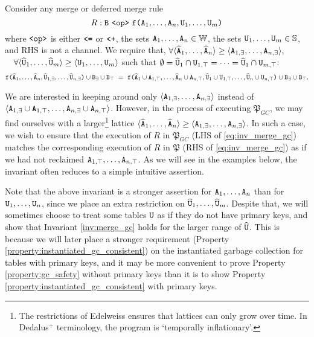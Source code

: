 \begin{invariant}\label{inv:merge_gc}
Consider any merge or deferred merge rule 
\[R: \tt{B} ~\tt{<op>}~ \tt{f(}\tt{A}_1,\dots,\tt{A}_n, \tt{U}_1, \dots, \tt{U}_m\tt{)}\]
where $\tt{<op>}$ is either $\tt{<=}$ or $\tt{<+}$,
the sets $\tt{A}_1,\dots,\tt{A}_n \in \mathbb{W}$,
the sets $\tt{U}_1,\dots,\tt{U}_m \in \mathbb{S}$,
and RHS is not a channel.
We require that, 
$\forall \langle \widehat{\tt{A}}_1, \dots, \widehat{\tt{A}}_n\rangle \geq \langle \tt{A}_{1,\exists},\dots,\tt{A}_{n,\exists} \rangle,$
$\quad
\forall \langle \widehat{\tt{U}}_1 , \dots, \widehat{\tt{U}}_m \rangle \geq \langle \tt{U}_1, \dots, \tt{U}_m \rangle$
such that $\emptyset = \widehat{\tt{U}}_1 \cap \tt{U}_{1,\top} = \dots = \widehat{\tt{U}}_1 \cap \tt{U}_{m,\top}$:
\begin{align}
\tt{f(}\widehat{\tt{A}}_1,\dots,\widehat{\tt{A}}_n, \widehat{\tt{U}}_{1,\exists},\dots,\widehat{\tt{U}}_{n,\exists}\tt{)}
\cup \tt{B}_\exists\cup \tt{B}_\top
~=~
\tt{f(}
\widehat{\tt{A}}_1 \cup \tt{A}_{1,\top},\dots,\widehat{\tt{A}}_n \cup \tt{A}_{n,\top}, \widehat{\tt{U}}_1 \cup \tt{U}_{1,\top},\dots,\widehat{\tt{U}}_n \cup \tt{U}_{n,\top}\tt{)} 
\cup \tt{B}_\exists \cup \tt{B}_\top.
\label{eq:inv_merge_gc}
\end{align}
\end{invariant}

We are interested in keeping around only $\langle \tt{A}_{1,\exists},\dots,\tt{A}_{n,\exists} \rangle$ instead of $\langle \tt{A}_{1,\exists} \cup \tt{A}_{1,\top}, \dots, \tt{A}_{n,\exists}  \cup \tt{A}_{n,\top}\rangle$.
However, in the process of executing $\mathfrak{P}_{GC}$, we may find ourselves with a larger\footnote{
  The restrictions of Edelweiss ensures that lattices can only grow over time.
    In Dedalus$^+$ terminology, the program is `temporally inflationary'.
} lattice $\langle \widehat{\tt{A}}_1, \dots, \widehat{\tt{A}}_n\rangle \geq \langle \tt{A}_{1,\exists},\dots,\tt{A}_{n,\exists} \rangle$.
In such a case, we wish to ensure that the execution of $R$ in $\mathfrak{P}_{GC}$ (LHS of \eqref{eq:inv_merge_gc}) matches the corresponding execution of $R$ in $\mathfrak{P}$ (RHS of \eqref{eq:inv_merge_gc}) as if we had not reclaimed $\tt{A}_{1,\top}, \dots, \tt{A}_{n,\top}$.
As we will see in the examples below, the invariant often reduces to a simple intuitive assertion.

Note that the above invariant is a stronger assertion for $\tt{A}_1, \dots, \tt{A}_n$ than for $\tt{U}_1, \dots, \tt{U}_n$, since we place an extra restriction on $\widehat{\tt{U}}_1, \dots, \widehat{\tt{U}}_m$.
Despite that, we will sometimes choose to treat some tables $\tt{U}$ as if they do not have primary keys, and show that Invariant \ref{inv:merge_gc} holds for the larger range of $\widehat{\tt{U}}$.
This is because we will later place a stronger requirement (Property \ref{property:instantiated_gc_consistent}) on the instantiated garbage collection for tables with primary keys, and it may be more convenient to prove Property \ref{property:gc_safety} without primary keys than it is to show Property \ref{property:instantiated_gc_consistent} with primary keys.

